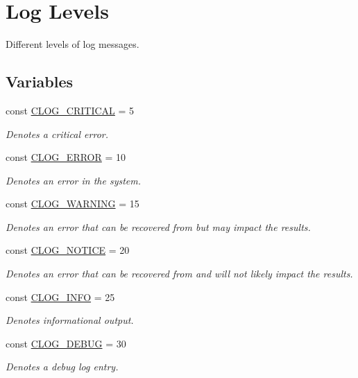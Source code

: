 \hypertarget{group__log__levels}{\section{Log Levels}
\label{group__log__levels}
}


Different levels of log messages.  


\subsection*{Variables}
\begin{DoxyCompactItemize}
\item 
const \hyperlink{group__log__levels_ga9e72f6a54bb75da33d3d8a8409cb9653}{C\-L\-O\-G\-\_\-\-C\-R\-I\-T\-I\-C\-A\-L} = 5
\begin{DoxyCompactList}\small\item\em Denotes a critical error. \end{DoxyCompactList}\item 
const \hyperlink{group__log__levels_gacd8b449d24550e76fa0b9682e816da94}{C\-L\-O\-G\-\_\-\-E\-R\-R\-O\-R} = 10
\begin{DoxyCompactList}\small\item\em Denotes an error in the system. \end{DoxyCompactList}\item 
const \hyperlink{group__log__levels_ga68940804f97ceabbba29e52e2caf22b9}{C\-L\-O\-G\-\_\-\-W\-A\-R\-N\-I\-N\-G} = 15
\begin{DoxyCompactList}\small\item\em Denotes an error that can be recovered from but may impact the results. \end{DoxyCompactList}\item 
const \hyperlink{group__log__levels_ga8fe5fb4d67cefbcc5556321a2a1ffaec}{C\-L\-O\-G\-\_\-\-N\-O\-T\-I\-C\-E} = 20
\begin{DoxyCompactList}\small\item\em Denotes an error that can be recovered from and will not likely impact the results. \end{DoxyCompactList}\item 
const \hyperlink{group__log__levels_gac0257446453fba0e349b1334d3a6c206}{C\-L\-O\-G\-\_\-\-I\-N\-F\-O} = 25
\begin{DoxyCompactList}\small\item\em Denotes informational output. \end{DoxyCompactList}\item 
const \hyperlink{group__log__levels_ga7a20d07461d8da70f7ddccd254222419}{C\-L\-O\-G\-\_\-\-D\-E\-B\-U\-G} = 30
\begin{DoxyCompactList}\small\item\em Denotes a debug log entry. \end{DoxyCompactList}\end{DoxyCompactItemize}


